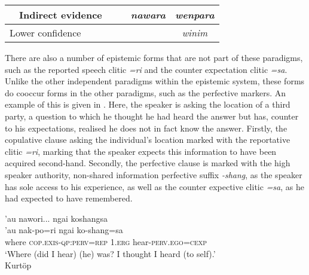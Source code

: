 \begin{table}
{\begin{tabular}{llll|c|c|c|c|}
            \multicolumn{1}{|l|}{}                                 & \multicolumn{3}{l|}{Indirect evidence}                & \cellcolor[HTML]{C0C0C0}                       & \cellcolor[HTML]{C0C0C0} & \textit{nawara}          & \textit{wenpara}                                                                                   \\ \hline
            \multicolumn{4}{|l|}{Lower confidence}                 & \cellcolor[HTML]{C0C0C0}                              & \cellcolor[HTML]{C0C0C0}                       & \cellcolor[HTML]{C0C0C0} & \textit{winim}                                                                                                                \\ \hline
        \end{tabular}}
\end{table}

There are also a number of epistemic forms that are not part of these paradigms, such as the reported speech clitic \textit{=ri} and the counter expectation clitic \textit{=sa}. Unlike the other independent paradigms within the epistemic system, these forms do cooccur forms in the other paradigms, such as the perfective markers. An example of this is given in . Here, the speaker is asking the location of a third party, a question to which he thought he had heard the answer but has, counter to his expectations, realised he does not in fact know the answer. Firstly, the copulative clause asking the individual's location marked with the reportative clitic \textit{=ri}, marking that the speaker expects this information to have been acquired second-hand. Secondly, the perfective clause is marked with the high speaker authority, non-shared information perfective suffix \textit{-shang}, as the speaker has sole access to his experience, as well as the counter expective clitic \textit{=sa}, as he had expected to have remembered.

\begin{exe}
    \ex\label{e:Discussion:KurtopCExp}
    \glll 'au nawori... ngai koshangsa \\
    'au nak-po=ri ngai ko-shang=sa \\
    where \textsc{cop.exis-qp:perv=rep} \textsc{1.erg} hear-\textsc{perv.ego=cexp} \\
    \glt `Where (did I hear) (he) was? I thought I heard (to self).' \\
    Kurtöp \cite[East Bodish: Bhutan,][126]{Hyslop2014}

\end{exe}

